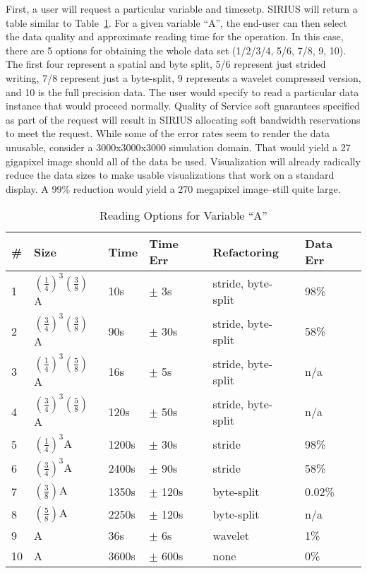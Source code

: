 \documentclass[letterpaper,twocolumn,10pt]{article}
\begin{document}
First, a user will request a particular variable and timesetp. SIRIUS will
return a table similar to Table~\ref{tab:results}. For a given variable ``A'',
the end-user can then select the data quality and approximate reading time for
the operation. In this case, there are 5 options for obtaining the whole data
set (1/2/3/4, 5/6, 7/8, 9, 10). The first four represent a spatial and byte
split, 5/6 represent just strided writing, 7/8 represent just a byte-split, 9
represents a wavelet compressed version, and 10 is the full precision data.
The user would specify to read a particular data instance that would proceed
normally.  Quality of Service soft guarantees specified as part of the request
will result in SIRIUS allocating soft bandwidth reservations to meet the
request. While some of the error rates seem to render the data unusable,
consider a 3000x3000x3000 simulation domain. That would yield a 27 gigapixel
image should all of the data be used. Visualization will already radically
reduce the data sizes to make usable visualizations that work on a standard
display. A 99\% reduction would yield a 270 megapixel image--still quite large.

\begin{table}[tbp]
\centering
\caption{Reading Options for Variable ``A''}
\label{tab:results}
\begin{tabular}{|l|l|l|l|l|l|}
\hline
\# & Size & Time & Time Err & Refactoring & Data Err\\
\hline
1 & $(\frac{1}{4})^3(\frac{3}{8})$A & 10s & $\pm$ 3s & stride, byte-split & 98\% \\
\hline
2 & $(\frac{3}{4})^3(\frac{3}{8})$A & 90s & $\pm$ 30s & stride, byte-split & 58\% \\
\hline
3 & $(\frac{1}{4})^3(\frac{5}{8})$A & 16s & $\pm$ 5s & stride, byte-split & n/a \\
\hline
4 & $(\frac{3}{4})^3(\frac{5}{8})$A & 120s & $\pm$ 50s & stride, byte-split & n/a \\
\hline
\hline
5 & $(\frac{1}{4})^3$A & 1200s & $\pm$ 30s & stride & 98\% \\
\hline
6 & $(\frac{3}{4})^3$A & 2400s & $\pm$ 90s & stride & 58\% \\
\hline
\hline
7 & $(\frac{3}{8})$A & 1350s & $\pm$ 120s & byte-split & 0.02\% \\
\hline
8 & $(\frac{5}{8})$A & 2250s & $\pm$ 120s & byte-split & n/a \\
\hline
\hline
9 & A & 36s & $\pm$ 6s & wavelet & 1\% \\
\hline
\hline
10 & A & 3600s & $\pm$ 600s & none & 0\% \\
\hline
\end{tabular}
\end{table}
\end{document}
